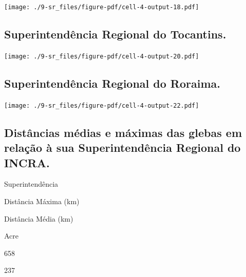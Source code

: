 \documentclass[
  letterpaper,
]{report}
\begin{document}
\texttt{[image: ./9-sr\_files/figure-pdf/cell-4-output-18.pdf]}

\hypertarget{superintenduxeancia-regional-do-tocantins.}{%
\subsection{Superintendência Regional do
Tocantins.}\label{superintenduxeancia-regional-do-tocantins.}}

\texttt{[image: ./9-sr\_files/figure-pdf/cell-4-output-20.pdf]}

\hypertarget{superintenduxeancia-regional-do-roraima.}{%
\subsection{Superintendência Regional do
Roraima.}\label{superintenduxeancia-regional-do-roraima.}}

\texttt{[image: ./9-sr\_files/figure-pdf/cell-4-output-22.pdf]}

\hypertarget{distuxe2ncias-muxe9dias-e-muxe1ximas-das-glebas-em-relauxe7uxe3o-uxe0-sua-superintenduxeancia-regional-do-incra.}{%
\subsection{Distâncias médias e máximas das glebas em relação à sua
Superintendência Regional do
INCRA.}\label{distuxe2ncias-muxe9dias-e-muxe1ximas-das-glebas-em-relauxe7uxe3o-uxe0-sua-superintenduxeancia-regional-do-incra.}}

\n  

\n    

\n      

Superintendência

\n      

Distância Máxima (km)

\n      

Distância Média (km)

\n    

\n  

\n  

\n    

\n      

Acre

\n      

658

\n      

237

\n    

\n    

\n      
\end{document}
